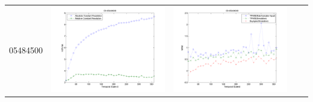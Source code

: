 \documentclass[11pt]{article}
\begin{document}
\begin{table}[H]
{\begin{tabular}{c  c   c   c  c }
05484500&\begin{minipage}{.4\textwidth}\includegraphics[width=\linewidth]{resultgraph/05484500e.png}\end{minipage}
&\begin{minipage}{.4\textwidth}\includegraphics[width=\linewidth]{resultgraph/05484500MI.png}\end{minipage}

\end{tabular}}
\end{table}
\end{document}

